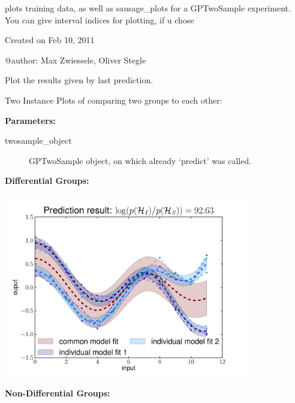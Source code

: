 \documentclass[letterpaper,10pt,english]{sphinxmanual}
\begin{document}
{\hyperref[plot:gptwosample.plot.plot_basic.plot_results]{}} plots
training data, as well as sausage\_plots for a GPTwoSample
experiment. You can give interval indices for plotting, if u chose

Created on Feb 10, 2011

@author: Max Zwiessele, Oliver Stegle

\begin{fulllineitems}
\label{plot:gptwosample.plot.plot_basic.plot_results}
Plot the results given by last prediction.

Two Instance Plots of comparing two groups to each other:

\textbf{Parameters:}
\begin{description}
\item[{twosample\_object}] \leavevmode{[}\code{gptwosample.twosample}{]}
GPTwoSample object, on which already `predict' was called.

\end{description}

\textbf{Differential Groups:}

\includegraphics[height=8cm]{plotGPTwoSampleDifferential.pdf}

\textbf{Non-Differential Groups:}


\end{fulllineitems}
\end{document}
